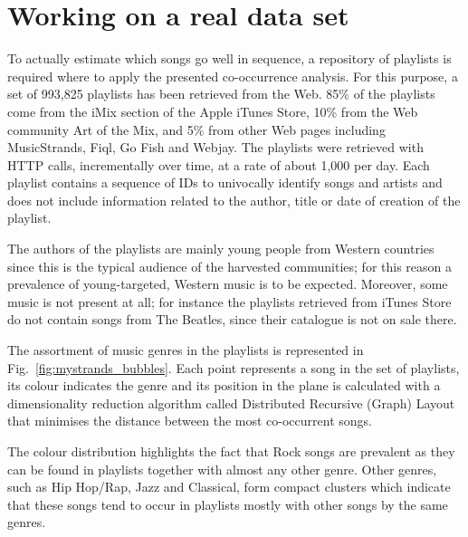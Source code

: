 
\section{Working on a real data set} %
\label{sec:the_application2}


To actually estimate which songs go well in sequence, a repository of playlists is required where to apply the presented co-occurrence analysis.
For this purpose, a set of 993,825 playlists has been retrieved from the Web.
%
85\% of the playlists come from the iMix section of the Apple iTunes Store,
10\% from the Web community Art of the Mix, and 5\% from other Web pages including MusicStrands, Fiql, Go Fish and Webjay.
The playlists were retrieved with HTTP calls, incrementally over time, at a rate of about 1,000 per day. %
Each playlist contains a sequence of IDs to univocally identify songs and artists and does not include information related to the author, title or date of creation of the playlist.

The authors of the playlists are mainly young people from Western countries since this is the typical audience of the harvested communities; for this reason a prevalence of young-targeted, Western music is to be expected.
Moreover, some music is not present at all; for instance the playlists retrieved from iTunes Store do not contain songs from The Beatles, since their catalogue is not on sale there.

The assortment of music genres in the playlists is represented in Fig.~\ref{fig:mystrands_bubbles}.
Each point represents a song in the set of playlists, its colour indicates the genre and its position in the plane is calculated with a dimensionality reduction algorithm called Distributed Recursive (Graph) Layout \cite{Martin08} that minimises the distance between the most co-occurrent songs.

The colour distribution highlights the fact that Rock songs are prevalent as they can be found in playlists together with almost any other genre.
Other genres, such as Hip Hop/Rap, Jazz and Classical, form compact clusters which indicate that these songs tend to occur in playlists mostly with other songs by the same genres.

